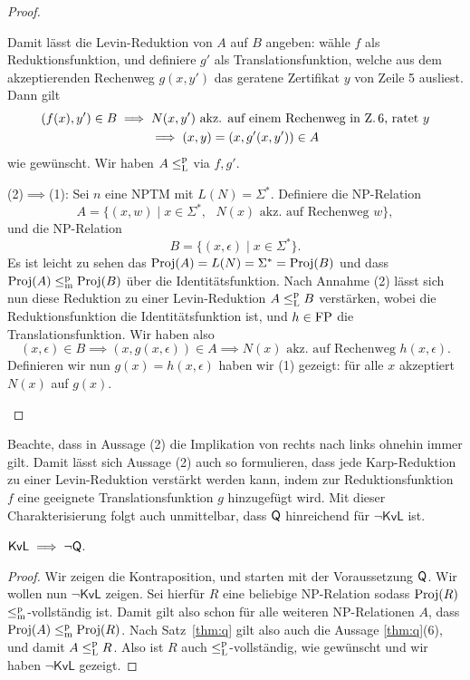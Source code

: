 \begin{proof}
\begin{prooflist}[label={}]
    Damit lässt die Levin-Reduktion von $A$ auf $B$ angeben: wähle $f$ als Reduktionsfunktion, und definiere $g'$ als Translationsfunktion, welche aus dem akzeptierenden Rechenweg $g(x, y')$ das geratene Zertifikat $y$ von Zeile 5 ausliest. Dann gilt
    \begin{gather*}
        (f(x), y') \in B \implies N(x, y') \text{ akz. auf einem Rechenweg in Z.\,6, ratet $y$}\\
        \implies (x,y)=(x, g'(x, y'))\in A
    \end{gather*}
    wie gewünscht. Wir haben $A\leq_\mathrm{L}^\mathrm{p}$ via $f, g'$.
\item (2)$\implies$(1): Sei $n$ eine NPTM mit $L(N)=\Sigma^*$.
    Definiere die NP-Relation
    \[ A = \{ (x, w) \mid x\in\Sigma^*,\text{ $N(x)$ akz. auf Rechenweg $w$} \}, \]
    und die NP-Relation
    \[ B = \{ (x, \epsilon) \mid x\in\Sigma^* \}. \]
    Es ist leicht zu sehen das $\operatorname{Proj}(A)=L(N)=\Sigma^*=\operatorname{Proj}(B)$ und dass $\operatorname{Proj}(A)\leq_\mathrm{m}^\mathrm{p}\operatorname{Proj}(B)$ über die Identitätsfunktion.
    Nach Annahme (2) lässt sich nun diese Reduktion zu einer Levin-Reduktion $A\leq_\mathrm{L}^\mathrm{p} B$ verstärken, wobei die Reduktionsfunktion die Identitätsfunktion ist, und $h\in\mathrm{FP}$ die Translationsfunktion.
    Wir haben also
    \[ (x,\epsilon)\in B \implies (x, g(x, \epsilon))\in A \implies \text{$N(x)$ akz. auf Rechenweg $h(x,\epsilon)$}. \]
    Definieren wir nun $g(x)=h(x,\epsilon)$ haben wir (1) gezeigt: für alle $x$ akzeptiert $N(x)$ auf $g(x)$.
\end{prooflist}
\end{proof}

Beachte, dass in Aussage (2) die Implikation von rechts nach links ohnehin immer gilt. 
Damit lässt sich Aussage (2) auch so formulieren, dass jede Karp-Reduktion zu einer Levin-Reduktion verstärkt werden kann, indem zur Reduktionsfunktion $f$ eine geeignete Translationsfunktion $g$ hinzugefügt wird.
Mit dieser Charakterisierung folgt auch unmittelbar, dass $\mathsf{Q}$ hinreichend für $\neg\mathsf{KvL}$ ist.


\begin{theorem}\label{thm:kvl-implies-q}
    $\mathsf{KvL} \implies \neg\mathsf{Q}$.
\end{theorem}
\begin{proof}
    Wir zeigen die Kontraposition, und starten mit der Voraussetzung $\mathsf{Q}$.
    Wir wollen nun $\neg\mathsf{KvL}$ zeigen. Sei hierfür $R$ eine beliebige NP-Relation sodass $\operatorname{Proj}(R)$ $\leq_\mathrm{m}^\mathrm{p}$-vollständig ist.
    Damit gilt also schon für alle weiteren NP-Relationen $A$, dass $\operatorname{Proj}(A)\leq_\mathrm{m}^\mathrm{p}\operatorname{Proj}(R)$.
    Nach Satz~\ref{thm:q} gilt also auch die Aussage \ref{thm:q}(6), und damit $A\leq_\mathrm{L}^\mathrm{p} R$. Also ist $R$ auch $\leq_\mathrm{L}^\mathrm{p}$-vollständig, wie gewünscht und wir haben $\neg\mathsf{KvL}$ gezeigt.
\end{proof}

